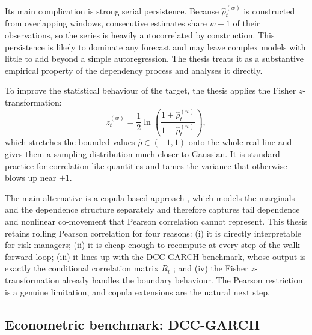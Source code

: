 Its main complication is strong serial persistence. Because $\hat{\rho}_{t}^{(w)}$ is constructed from overlapping windows, consecutive estimates share $w-1$ of their observations, so the series is heavily autocorrelated by construction. This persistence is likely to dominate any forecast and may leave complex models with little to add beyond a simple autoregression. The thesis treats it as a substantive empirical property of the dependency process and analyses it directly.

To improve the statistical behaviour of the target, the thesis applies the Fisher $z$-transformation:
\begin{equation}
    z_{t}^{(w)} = \frac{1}{2}\ln\!\left(\frac{1 + \hat{\rho}_{t}^{(w)}}{1 - \hat{\rho}_{t}^{(w)}}\right),
\end{equation}
which stretches the bounded values $\hat{\rho} \in (-1,1)$ onto the whole real line and gives them a sampling distribution much closer to Gaussian. It is standard practice for correlation-like quantities and tames the variance that otherwise blows up near $\pm 1$.

The main alternative is a copula-based approach \cite{patton2006copula}, which models the marginals and the dependence structure separately and therefore captures tail dependence and nonlinear co-movement that Pearson correlation cannot represent. This thesis retains rolling Pearson correlation for four reasons: (i) it is directly interpretable for risk managers; (ii) it is cheap enough to recompute at every step of the walk-forward loop; (iii) it lines up with the DCC-GARCH benchmark, whose output is exactly the conditional correlation matrix $R_t$ \cite{engle2001theoretical}; and (iv) the Fisher $z$-transformation already handles the boundary behaviour. The Pearson restriction is a genuine limitation, and copula extensions are the natural next step.

\subsection{Econometric benchmark: DCC-GARCH}

